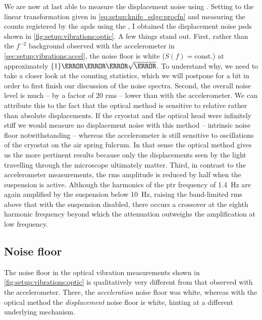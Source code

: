 We are now at last able to measure the displacement noise using \pyspeck.
Setting  to the linear transformation given in \cref{eq:setup:knife_edge:procfn} and measuring the counts registered by the \glspl{apd} using the \taggershort,
I obtained the displacement noise \glspl{psd} shown in \cref{fig:setup:vibrations:optic}.
A few things stand out.
First, rather than the $f^{-2}$ background observed with the accelerometer in \cref{sec:setup:vibrations:accel}, the noise floor is white ($S(f)=\text{const.}$) at approximately $\qty{1}{\nano\meter\per\sqrt{\hertz}}$.
To understand why, we need to take a closer look at the counting statistics, which we will postpone for a bit in order to first finish our discussion of the noise spectra.
Second, the overall noise level is much -- by a factor of 20 \gls{rms} -- lower than with the accelerometer.
We can attribute this to the fact that the optical method is sensitive to relative rather than absolute displacements.
If the cryostat and the optical head were infinitely stiff we would measure no displacement noise with this method -- intrinsic noise floor notwithstanding -- whereas the accelerometer is still sensitive to oscillations of the cryostat on the air spring fulcrum.
In that sense the optical method gives us the more pertinent results because only the displacements seen by the light travelling through the microscope ultimately matter.
Third, in contrast to the accelerometer measurements, the \gls{rms} amplitude is reduced by half when the suspension is active.
Although the harmonics of the \gls{ptr} frequency of \qty{1.4}{\hertz} are again amplified by the suspension below \qty{10}{\hertz}, raising the band-limited \gls{rms} above that with the suspension disabled, there occurs a crossover at the eighth harmonic frequency beyond which the attenuation outweighs the amplification at low frequency.

\subsection{Noise floor}\label{subsec:setup:vibrations:optic:noise_floor}
The noise floor in the optical vibration measurements shown in \cref{fig:setup:vibrations:optic} is qualitatively very different from that observed with the accelerometer.
There, the \emph{acceleration} noise floor was white,
whereas with the optical method the \emph{displacement} noise floor is white, hinting at a different underlying mechanism.

